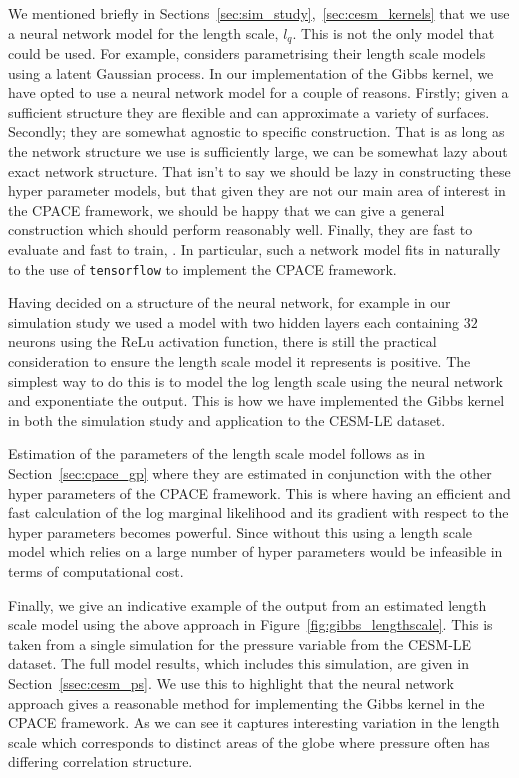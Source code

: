 We mentioned briefly in Sections~\ref{sec:sim_study},~\ref{sec:cesm_kernels} that we use a neural network model for the length scale, $l_q$.
This is not the only model that could be used.
For example, \citep{paciorek_spatial_2006} considers parametrising their length scale models using a latent Gaussian process.
In our implementation of the Gibbs kernel, we have opted to use a neural network model for a couple of reasons.
Firstly; given a sufficient structure they are flexible and can approximate a variety of surfaces.
Secondly; they are somewhat agnostic to specific construction.
That is as long as the network structure we use is sufficiently large, we can be somewhat lazy about exact network structure. 
That isn't to say we should be lazy in constructing these hyper parameter models, but that given they are not our main area of interest in the CPACE framework, we should be happy that we can give a general construction which should perform reasonably well.
Finally, they are fast to evaluate and fast to train, \citep{abadi_tensorflow_2016}.
In particular, such a network model fits in naturally to the use of \verb*|tensorflow| to implement the CPACE framework.

Having decided on a structure of the neural network, for example in our simulation study we used a model with two hidden layers each containing $32$ neurons using the ReLu activation function, there is still the practical consideration to ensure the length scale model it represents is positive.
The simplest way to do this is to model the log length scale using the neural network and exponentiate the output.
This is how we have implemented the Gibbs kernel in both the simulation study and application to the CESM-LE dataset. 

Estimation of the parameters of the length scale model follows as in Section~\ref{sec:cpace_gp} where they are estimated in conjunction with the other hyper parameters of the CPACE framework.
This is where having an efficient and fast calculation of the log marginal likelihood and its gradient with respect to the hyper parameters becomes powerful.
Since without this using a length scale model which relies on a large number of hyper parameters would be infeasible in terms of computational cost.

Finally, we give an indicative example of the output from an estimated length scale model using the above approach in Figure~\ref{fig:gibbs_lengthscale}.
This is taken from a single simulation for the pressure variable from the CESM-LE dataset.
The full model results, which includes this simulation, are given in Section~\ref{ssec:cesm_ps}.
We use this to highlight that the neural network approach gives a reasonable method for implementing the Gibbs kernel in the CPACE framework.
As we can see it captures interesting variation in the length scale which corresponds to distinct areas of the globe where pressure often has differing correlation structure.


